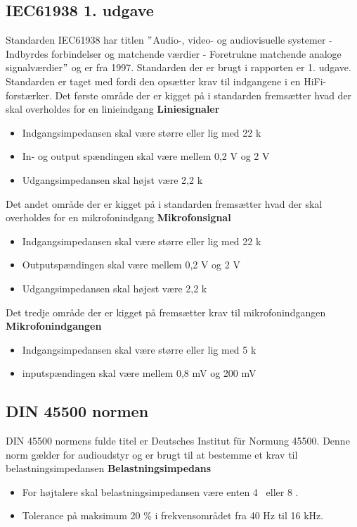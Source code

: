\subsection*{IEC61938 1. udgave}
\label{IEC61938}
Standarden IEC61938 har titlen $"$Audio-, video- og audiovisuelle systemer - Indbyrdes forbindelser og matchende værdier - Foretrukne matchende analoge signalværdier$"$ og er fra 1997. Standarden der er brugt i rapporten er 1. udgave. Standarden er taget med fordi den opsætter krav til indgangene i en HiFi-forstærker.\cite{IEC61938} 
\newline
\newline
Det første område der er kigget på i standarden fremsætter hvad der skal overholdes for en linieindgang
\newline
\newline
\textbf{Liniesignaler}
\begin{itemize}
\item Indgangsimpedansen skal være større eller lig med 22 k\ohm
\item In- og output spændingen skal være mellem 0,2 V og 2 V
\item Udgangsimpedansen skal højst være 2,2 k\ohm
\end{itemize}
Det andet område der er kigget på i standarden fremsætter hvad der skal overholdes for en mikrofonindgang
\newline 
\newline
\textbf{Mikrofonsignal}
\begin{itemize}
\item Indgangsimpedansen skal være større eller lig med 22 k\ohm
\item Outputspændingen skal være mellem 0,2 V og 2 V
\item Udgangsimpedansen skal højest være 2,2 k\ohm
\end{itemize}
Det tredje område der er kigget på fremsætter krav til mikrofonindgangen
\newline 
\newline
\textbf{Mikrofonindgangen}
\begin{itemize}
\item Indgangsimpedansen skal være større eller lig med 5 k\ohm
\item inputspændingen skal være mellem 0,8 mV og 200 mV
\end{itemize}


\subsection*{DIN 45500 normen}
\label{DIN45500}
DIN 45500 normens fulde titel er Deutsches Institut f\"{u}r Normung 45500. Denne norm gælder for audioudstyr og er brugt til at bestemme et krav til belastningsimpedansen
\newline 
\newline
\textbf{Belastningsimpedans}
\begin{itemize}
\item For højtalere skal belastningsimpedansen være enten 4 \ohm~eller 8 \ohm.
\item Tolerance på maksimum 20 \% i frekvensområdet fra 40 Hz til 16 kHz.
\end{itemize}